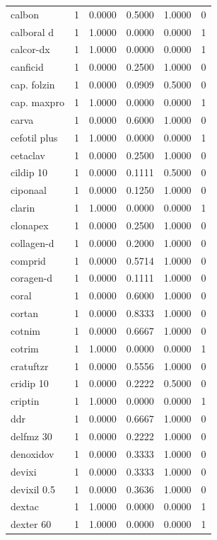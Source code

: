 \begin{longtable}{p{3.0cm}rrrrr}
calbon & 1 & 0.0000 & 0.5000 & 1.0000 & 0 \\
calboral d & 1 & 1.0000 & 0.0000 & 0.0000 & 1 \\
calcor-dx & 1 & 1.0000 & 0.0000 & 0.0000 & 1 \\
canficid & 1 & 0.0000 & 0.2500 & 1.0000 & 0 \\
cap. folzin & 1 & 0.0000 & 0.0909 & 0.5000 & 0 \\
cap. maxpro & 1 & 1.0000 & 0.0000 & 0.0000 & 1 \\
carva & 1 & 0.0000 & 0.6000 & 1.0000 & 0 \\
cefotil plus & 1 & 1.0000 & 0.0000 & 0.0000 & 1 \\
cetaclav & 1 & 0.0000 & 0.2500 & 1.0000 & 0 \\
cildip 10 & 1 & 0.0000 & 0.1111 & 0.5000 & 0 \\
ciponaal & 1 & 0.0000 & 0.1250 & 1.0000 & 0 \\
clarin & 1 & 1.0000 & 0.0000 & 0.0000 & 1 \\
clonapex & 1 & 0.0000 & 0.2500 & 1.0000 & 0 \\
collagen-d & 1 & 0.0000 & 0.2000 & 1.0000 & 0 \\
comprid & 1 & 0.0000 & 0.5714 & 1.0000 & 0 \\
coragen-d & 1 & 0.0000 & 0.1111 & 1.0000 & 0 \\
coral & 1 & 0.0000 & 0.6000 & 1.0000 & 0 \\
cortan & 1 & 0.0000 & 0.8333 & 1.0000 & 0 \\
cotnim & 1 & 0.0000 & 0.6667 & 1.0000 & 0 \\
cotrim & 1 & 1.0000 & 0.0000 & 0.0000 & 1 \\
cratuftzr & 1 & 0.0000 & 0.5556 & 1.0000 & 0 \\
cridip 10 & 1 & 0.0000 & 0.2222 & 0.5000 & 0 \\
criptin & 1 & 1.0000 & 0.0000 & 0.0000 & 1 \\
ddr & 1 & 0.0000 & 0.6667 & 1.0000 & 0 \\
delfmz 30 & 1 & 0.0000 & 0.2222 & 1.0000 & 0 \\
denoxidov & 1 & 0.0000 & 0.3333 & 1.0000 & 0 \\
devixi & 1 & 0.0000 & 0.3333 & 1.0000 & 0 \\
devixil 0.5 & 1 & 0.0000 & 0.3636 & 1.0000 & 0 \\
dextac & 1 & 1.0000 & 0.0000 & 0.0000 & 1 \\
dexter 60 & 1 & 1.0000 & 0.0000 & 0.0000 & 1 \\

\end{longtable}
